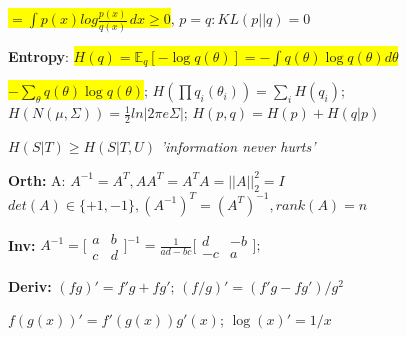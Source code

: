 \documentclass[11pt,landscape,a4paper,fleqn]{article}
\newcommand{\mhl}[1]{\setlength{\fboxsep}{0pt}\colorbox{yellow}{#1}}
\begin{document}
\begin{multicols*}{4}
{\mhl{$= \int p(x) log \frac{p(x)}{q(x)} \, dx \geq 0$}}, $p=q: KL(p||q) = 0$


\textbf{Entropy}: \mhl{{\fontsize{9.5}{6}\selectfont $H(q) = \mathbb{E}_q[-\log q(\theta)] = - \int q(\theta)\log q(\theta) d\theta $}}

\mhl{{\fontsize{9.3}{6}\selectfont $- \sum_\theta q(\theta) \log q(\theta)$}};
$H(\prod q_i(\theta_i)) = \sum_i H(q_i)$; $H(N(\mu, \Sigma)) = \frac{1}{2}  ln|2\pi e \Sigma|$;
$H(p,q) = H(p) + H(q | p)$

$H(S | T) \geq H(S | T, U)$ \textit{'information never hurts'}

\textbf{Orth:} A: $A^{-1}=A^T,AA^T=A^TA=||A||_2^2=I$\\
$det(A)\in\{+1,-1\}, (A^{-1})^T=(A^T)^{-1}, rank(A)=n$

\textbf{Inv:} $A^{-1}=
\big[
\begin{smallmatrix}
a&b \\ 
c&d
\end{smallmatrix}\big]^{-1}=
\frac{1}{ad-bc}
\big[
\begin{smallmatrix}
d&-b \\ 
-c&a
\end{smallmatrix}\big];
$

\textbf{Deriv:}
$(fg)' = f'g + fg'$; $(f/g)' = (f'g - fg')/g^2$

$f(g(x))' = f'(g(x))g'(x)$; $\log(x)' = 1/x$

\iffalse
\textbf{Eigdec:}
$A,Q \in \mathbb{R}^{n\times n}, A=Q\Lambda Q^{-1},\! \Lambda = diag(\lambda_i)$\\
$Q=[v_1,..,v_n], \text{(col's are e-vec.)}$

if all $\lambda_i\geq0: A^{-1}=Q\Lambda^{-1}Q^{-1},\Lambda^{-1}=diag(\frac{1}{\lambda_i})$\\
if $A=A^T\text{(symm.) and }x^TAx\geq0 \forall x \neq 0 \rightarrow psd$

\textbf{SVD:}
$X\in \mathbb{R}^{n\times p}, U\in \mathbb{R}^{n\times n}, S\in \mathbb{R}^{n\times p},
V\in \mathbb{R}^{p\times p}$\\
$X=USV^T=\sum_{k=1}^{rank(X)}\sigma_{k,k}u_k (v_k)^T,\!${\tiny{($U^TU=V^TV=I$)}}\\
$X^TX=VS^TU^TUSV^T=VS^TSV^T=V\Sigma V^T$\\
$\Sigma = diag(\sigma_1^2,..,\sigma_n^2);\sigma_i^2=\lambda_i; \forall \lambda_i \geq 0$
\fi




\end{multicols*}
\end{document}
